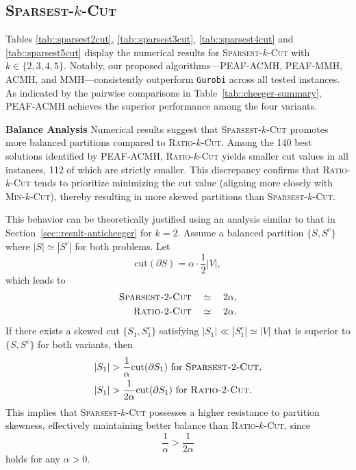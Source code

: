 \documentclass[12pt, a4paper]{article}%
\newcommand{\cut}{\mathrm{cut}}
\numberwithin{equation}{section}
\theoremstyle{plain}
\begin{document}
			
			
			
			
			
			
			
			
			
			\subsection{\textsc{Sparsest}-$k$-\textsc{Cut}}
			\label{sec::sparsest-k-cut}
			
				Tables \ref{tab::sparsest2cut}, \ref{tab::sparsest3cut}, \ref{tab::sparsest4cut} and \ref{tab::sparsest5cut} display the numerical results for \textsc{Sparsest}-$k$-\textsc{Cut} with $k \in \{2, 3, 4, 5\}$. Notably, our proposed  algorithms---PEAF-ACMH, PEAF-MMH, ACMH, and MMH---consistently outperform \texttt{Gurobi} across all tested instances. As indicated by the pairwise comparisons in Table~\ref{tab::cheeger-summary}, PEAF-ACMH achieves the superior performance among the four variants.
			
			\textbf{Balance Analysis}
			Numerical results suggest that \textsc{Sparsest}-$k$-\textsc{Cut} promotes more balanced partitions compared to \textsc{Ratio}-$k$-\textsc{Cut}. Among the 140 best solutions identified by PEAF-ACMH, \textsc{Ratio}-$k$-\textsc{Cut} yields smaller cut values in all instances, 112 of which are strictly smaller. This discrepancy confirms that \textsc{Ratio}-$k$-\textsc{Cut} tends to prioritize minimizing the cut value (aligning more closely with \textsc{Min}-$k$-\textsc{Cut}), thereby resulting in more skewed partitions than \textsc{Sparsest}-$k$-\textsc{Cut}.
			
			This behavior can be theoretically justified using an analysis similar to that in Section~\ref{sec::result-anticheeger} for $k=2$. Assume a balanced partition $\{S, S^c\}$ where $|S| \simeq |S^c|$ for both problems. Let $$\cut(\partial S)=\alpha\cdot\frac{1}{2}|V|,$$ 
			which leads to 	\begin{align*}
				\textsc{Sparsest-}2\textsc{-Cut}\quad&\simeq\quad 2\alpha, \\
				\textsc{Ratio-}2\textsc{-Cut}\quad&\simeq\quad 2\alpha.
			\end{align*} 
			If there exists a skewed cut $\{S_1, S_1^c\}$ satisfying $|S_1| \ll |S_1^c| \simeq |V|$ that is superior to $\{S, S^c\}$ for both variants, then \begin{align*}
				|S_1|&>\frac{1}{\alpha}\cut(\partial S_1) \text{ for }\textsc{Sparsest-}2\textsc{-Cut},\\ 
				|S_1|&>\frac{1}{2\alpha}\cut(\partial S_1) \text{ for }\textsc{Ratio-}2\textsc{-Cut}. \\
			\end{align*} This implies that \textsc{Sparsest}-$k$-\textsc{Cut} possesses a higher resistance to partition skewness, effectively maintaining better balance than \textsc{Ratio}-$k$-\textsc{Cut}, since$$
			\frac{1}{\alpha}  > \frac{1}{2\alpha}
			$$ holds for any $\alpha > 0$.
			
\end{document}
